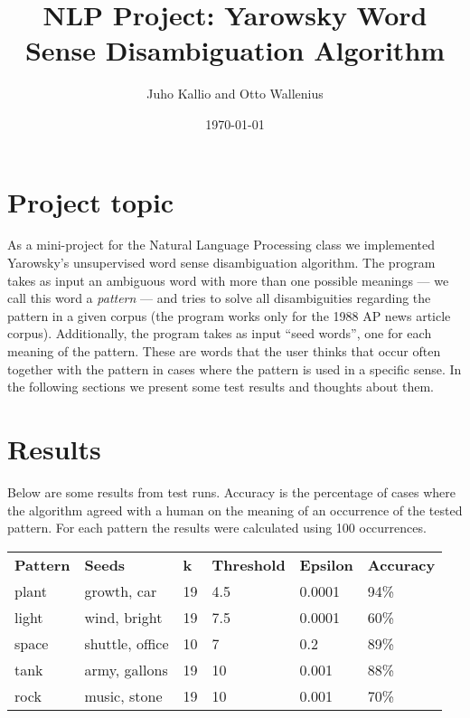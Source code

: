 \documentclass[finnish]{article}
\title{NLP Project: Yarowsky Word Sense Disambiguation Algorithm}
\author{Juho Kallio and Otto Wallenius}
\date{\today}
\begin{document}
\maketitle
\section{Project topic}
As a mini-project for the Natural Language Processing class we implemented Yarowsky's unsupervised word sense disambiguation algorithm. The program takes as input an ambiguous word with more than one possible meanings --- we call this word a \emph{pattern} --- and tries to solve all disambiguities regarding the pattern in a given corpus (the program works only for the 1988 AP news article corpus). Additionally, the program takes as input ``seed words'', one for each meaning of the pattern. These are words that the user thinks that occur often together with the pattern in cases where the pattern is used in a specific sense. In the following sections we present some test results and thoughts about them.

\section{Results}
Below are some results from test runs. Accuracy is the percentage of cases where the algorithm agreed with a human on the meaning of an occurrence of the tested pattern. For each pattern the results were calculated using 100 occurrences.

\begin{tabular}{l l l l l l}

\textbf{Pattern} & \textbf{Seeds} & \textbf{k} & \textbf{Threshold} & \textbf{Epsilon} & \textbf{Accuracy} \\
plant   & growth, car     & 19 & 4.5 & 0.0001 & 94\% \\
light   & wind, bright    & 19 & 7.5 & 0.0001 & 60\% \\
space   & shuttle, office & 10 & 7   & 0.2    & 89\% \\
tank    & army, gallons   & 19 & 10  & 0.001  & 88\% \\
rock    & music, stone    & 19 & 10  & 0.001  & 70\%
\end{tabular}
\end{document}
